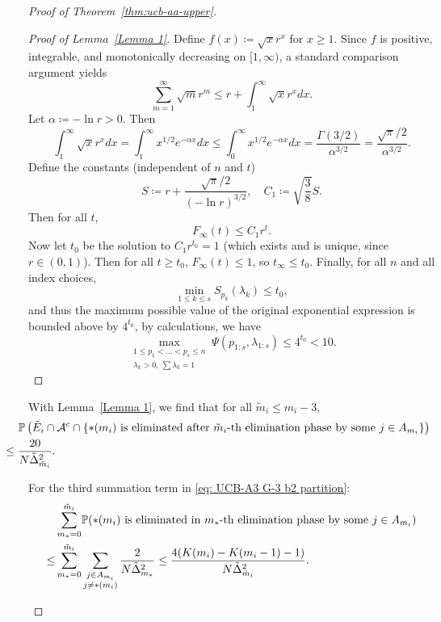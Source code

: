 \documentclass[
  12pt]{article}
\begin{document}
\begin{proof}[Proof of Theorem~\ref{thm:ucb-aa-upper}]
\begin{itemize}
\begin{itemize}
\begin{proof}[Proof of Lemma~\ref{Lemma 1}]
Define \( f(x) \coloneqq \sqrt{x} r^x \) for \( x \geq 1 \). Since \( f \) is positive, integrable, and monotonically decreasing on \( [1, \infty) \), a standard comparison argument yields
\[
\sum_{m=1}^\infty \sqrt{m} r^m \leq r + \int_1^\infty \sqrt{x} r^x dx.
\]
Let \( \alpha \coloneqq -\ln r > 0 \). Then
\[
\int_1^\infty \sqrt{x} r^x dx = \int_1^\infty x^{1/2} e^{-\alpha x} dx \leq \int_0^\infty x^{1/2} e^{-\alpha x} dx = \frac{\Gamma(3/2)}{\alpha^{3/2}} = \frac{\sqrt{\pi}/2}{\alpha^{3/2}}.
\]
Define the constants (independent of \( n \) and \( t \))
\[
S \coloneqq r + \frac{\sqrt{\pi}/2}{(-\ln r)^{3/2}}, \quad C_1 \coloneqq \sqrt{\frac{3}{8}} S.
\]
Then for all \( t \),
\[
F_\infty(t) \leq C_1 r^t.
\]
Now let \( t_0 \) be the solution to \( C_1 r^{t_0} = 1 \) (which exists and is unique, since \( r \in (0,1) \)). Then for all \( t \geq t_0 \), \( F_\infty(t) \leq 1 \), so \( t_\infty \leq t_0 \). Finally, for all \( n \) and all index choices,
\[
\min_{1 \leq k \leq s} S_{p_k}(\lambda_k) \leq t_0,
\]
and thus the maximum possible value of the original exponential expression is bounded above by \( 4^{t_0} \), by calculations, we have
\[
\max_{\substack{1 \leq p_1 < \dots < p_s \leq n \\ \lambda_k > 0,\ \sum \lambda_k = 1}} \Psi(p_{1:s}, \lambda_{1:s}) \leq 4^{t_0}<10.
\]\end{proof}
With Lemma~\ref{Lemma 1}, we find that for all $\tilde{m}_i\leq m_i-3$, 
\begin{align}
&\!\!\!\!\!\!\!\!\!\!\!\!\!\!\!\!\;\;\;\;\;\mathbb{P}\left(\tilde{E}_i\cap\mathcal{A}^c\cap\left\{\text{$*(m_i)$ is eliminated after $\tilde{m}_i$-th elimination phase } \text{by some }j\in A_{m_i}\right\}\right)\notag\\
   & \!\!\!\!\!\!\!\!\!\!\!\!\!\!\!\!\leq \frac{20}{N\tilde{\Delta}_{\tilde{m}_i}^2}.
    \label{eq: UCB-A3 G-3 b2 partition term 2}
\end{align}
\end{itemize}
 For the third summation term in \eqref{eq: UCB-A3 G-3 b2 partition}:
\begin{align}
    &\sum_{m_*=0}^{\tilde{m}_i} \!\mathbb{P}\!\left(\text{$*(m_i)$ is eliminated in $m_*$-th elimination phase } \text{by some }j\in A_{m_i}\right)\notag\\
    \leq &\sum_{m_*=0}^{\tilde{m}_i}\sum_{\substack{j \in A_{m_i}\\j\neq *(m_i)}}\frac{2}{N\tilde{\Delta}_{m_*}^2}\leq \frac{4(K(m_i)-K(m_i-1)-1)}{N\tilde{\Delta}_{\tilde{m}_i}^2}.
    \label{eq: UCB-A3 G-3 b2 partition term 3}

\end{align}
\end{itemize}
\end{proof}
\end{document}
